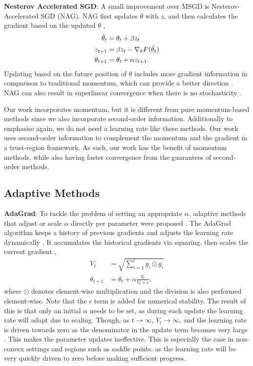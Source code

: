\textbf{Nesterov Accelerated SGD}: A small improvement over MSGD is Nesterov-Accelerated SGD (NAG). NAG first updates $\theta$ with $z$, and then calculates the gradient based on the updated $\theta$ \citep{nesterov1983method, sutskever2013importance},
\begin{align}
    \Tilde{\theta}_{t} &= \theta_{t} + \beta z_{t} \\
    z_{t+1} &= \beta z_t - \nabla_{\theta} F(\Tilde{\theta}_{t}) \\
    \theta_{t+1} &= \theta_{t} + \alpha z_{t+1}.
\end{align}
Updating based on the future position of $\theta$ includes more gradient information in comparison to traditional momentum, which can provide a better direction \citep{nesterov1983method, dozat2016nadam}. NAG can also result in superlinear convergence when there is no stochasticity \citep{nesterov1983method, sutskever2013importance}.

Our work incorporates momentum, but it is different from pure momentum-based methods since we also incorporate second-order information. Additionally to emphasise again, we do not need a learning rate like these methods. Our work uses second-order information to complement the momentum and the gradient in a trust-region framework. As such, our work has the benefit of momentum methods, while also having faster convergence from the guarantees of second-order methods. 

\subsection{Adaptive Methods}
\label{ssec:adaptive_methods}

\textbf{AdaGrad}: To tackle the problem of setting an appropriate $\alpha$, adaptive methods that adjust or scale $\alpha$ directly per parameter were proposed \cite{duchi2011adagrad}. The AdaGrad algorithm keeps a history of previous gradients and adjusts the learning rate dynamically \citep{duchi2011adagrad}. It accumulates the historical gradients via squaring, then scales the current gradient \citep{duchi2011adagrad},
\begin{align}
    V_t &= \sqrt{\sum_{i=1}^{t} g_i \odot g_i} \\
    \theta_{t+1} &= \theta_{t} + \alpha \frac{g_t}{V_t + \epsilon},
\end{align}
where $\odot$ denotes element-wise multiplication and the division is also performed element-wise. Note that the $\epsilon$ term is added for numerical stability. The result of this is that only an initial $\alpha$ needs to be set, as during each update the learning rate will adapt due to scaling. Though, as $t \rightarrow \infty$, $V_{t} \rightarrow \infty$, and the learning rate is driven towards zero as the denominator in the update term becomes very large \citep{ruder2016overview,rmsprop2012,zeiler2012adadelta}. This makes the parameter updates ineffective. This is especially the case in non-convex settings and regions such as saddle points, as the learning rate will be very quickly driven to zero before making sufficient progress.

